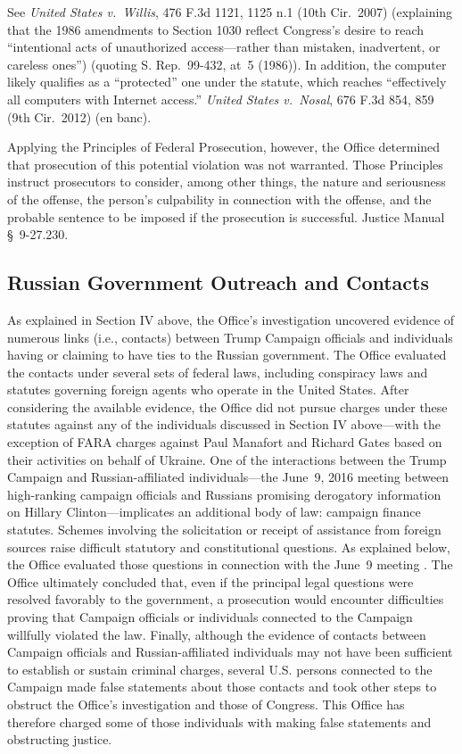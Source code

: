 See \textit{United States v.\ Willis}, 476 F.3d 1121, 1125 n.1 (10th Cir.~2007) (explaining that the 1986 amendments to Section 1030 reflect Congress's desire to reach ``intentional acts of unauthorized access---rather than mistaken, inadvertent, or careless ones'') (quoting S. Rep.~99-432, at~5 (1986)).
In addition, the computer  likely qualifies as a ``protected'' one under the statute, which reaches ``effectively all computers with Internet access.''
\textit{United States v.\ Nosal}, 676 F.3d 854, 859 (9th Cir.~2012) (en banc).

Applying the Principles of Federal Prosecution, however, the Office determined that prosecution of this potential violation was not warranted.
Those Principles instruct prosecutors to consider, among other things, the nature and seriousness of the offense, the person's culpability in connection with the offense, and the probable sentence to be imposed if the prosecution is successful.
Justice Manual \S~9-27.230. 

\subsection{Russian Government Outreach and Contacts}
As explained in Section IV above, the Office's investigation uncovered evidence of numerous links (i.e., contacts) between Trump Campaign officials and individuals having or claiming to have ties to the Russian government.
The Office evaluated the contacts under several sets of federal laws, including conspiracy laws and statutes governing foreign agents who operate in the United States.
After considering the available evidence, the Office did not pursue charges under these statutes against any of the individuals discussed in Section IV above---with the exception of FARA charges against Paul Manafort and Richard Gates based on their activities on behalf of Ukraine.
One of the interactions between the Trump Campaign and Russian-affiliated individuals---the June~9, 2016 meeting between high-ranking campaign officials and Russians promising derogatory information on Hillary Clinton---implicates an additional body of law: campaign finance statutes.
Schemes involving the solicitation or receipt of assistance from foreign sources raise difficult statutory and constitutional questions.
As explained below, the Office evaluated those questions in connection with the June~9 meeting .
The Office ultimately concluded that, even if the principal legal questions were resolved favorably to the government, a prosecution would encounter difficulties proving that Campaign officials or individuals connected to the Campaign willfully violated the law.
Finally, although the evidence of contacts between Campaign officials and Russian-affiliated individuals may not have been sufficient to establish or sustain criminal charges, several U.S. persons connected to the Campaign made false statements about those contacts and took other steps to obstruct the Office's investigation and those of Congress.
This Office has therefore charged some of those individuals with making false statements and obstructing justice.

